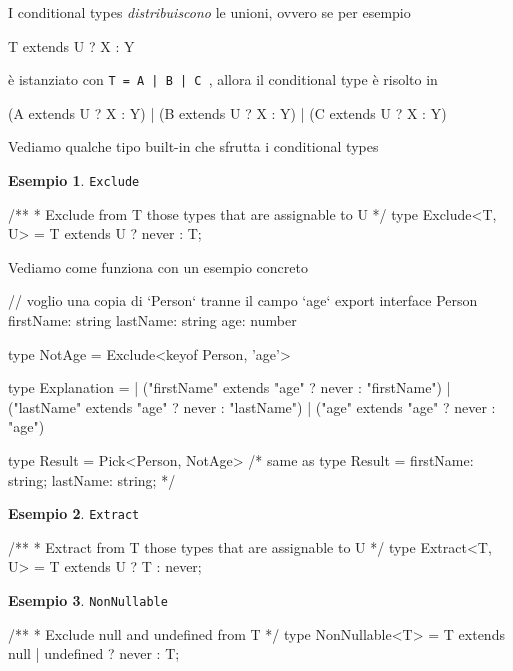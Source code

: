 \documentclass[12pt]{article}
\theoremstyle{definition}
\newtheorem{example}{Esempio}[subsection]
\newenvironment{code}
  {\vspace{0.5cm} \VerbatimEnvironment\begin{typescriptcode}}
  {\end{typescriptcode} \vspace{0.2cm}}
\begin{document}
I conditional types \emph{distribuiscono} le unioni, ovvero se per esempio

\begin{code}
T extends U ? X : Y
\end{code}

è istanziato con \texttt{T = A | B | C }, allora il conditional type è risolto in

\begin{code}
  (A extends U ? X : Y)
| (B extends U ? X : Y)
| (C extends U ? X : Y)
\end{code}

Vediamo qualche tipo built-in che sfrutta i conditional types

\begin{example}
\texttt{Exclude}

\begin{code}
/**
 * Exclude from T those types that are assignable to U
 */
type Exclude<T, U> = T extends U ? never : T;
\end{code}
\end{example}

Vediamo come funziona con un esempio concreto

\begin{code}
// voglio una copia di `Person` tranne il campo `age`
export interface Person {
  firstName: string
  lastName: string
  age: number
}

type NotAge = Exclude<keyof Person, 'age'>

type Explanation =
  | ("firstName" extends "age" ? never : "firstName")
  | ("lastName" extends "age" ? never : "lastName")
  | ("age" extends "age" ? never : "age")

type Result = Pick<Person, NotAge>
/* same as
type Result = {
    firstName: string;
    lastName: string;
}
*/
\end{code}

\begin{example}
\texttt{Extract}

\begin{code}
/**
 * Extract from T those types that are assignable to U
 */
type Extract<T, U> = T extends U ? T : never;
\end{code}
\end{example}

\begin{example}
\texttt{NonNullable}

\begin{code}
/**
 * Exclude null and undefined from T
 */
type NonNullable<T> = T extends null | undefined ? never : T;
\end{code}
\end{example}
\end{document}
